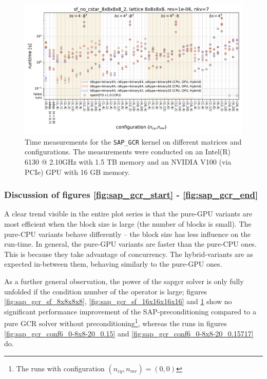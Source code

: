 \documentclass{article}
\theoremstyle{plain} %
\theoremstyle{convention} %
\theoremstyle{remark} %
\def\code#1{\texttt{#1}}
\numberwithin{equation}{section}
\begin{document}
\begin{figure}[htbp]
    \centering
    \includegraphics[width=1.0\textwidth]{plots/sap_gcr_sf_no_cstar_8x8x8x8_2_lattice_8x8x8x8_res=1e-06_nkv=7}
    \caption{Time measurements for the \code{SAP\_GCR} kernel on different matrices and configurations. The measurements were conducted on an Intel(R) 6130 @ 2.10GHz with 1.5 TB memory and an NVIDIA V100 (via PCIe) GPU with 16 GB memory.}
    \label{fig:sap_gcr4}
    \label{fig:sap_gcr_end}
    \label{fig:sap_gcr_sf_8x8x8x8_2}
\end{figure}

\subsubsection{Discussion of figures \ref{fig:sap_gcr_start} - \ref{fig:sap_gcr_end}}

A clear trend visible in the entire plot series is that the pure-GPU variants are most efficient when the block size is large (the number of blocks is small). The pure-CPU variants behave differently -- the block size has less influence on the run-time. In general, the pure-GPU variants are faster than the pure-CPU ones. This is because they take advantage of concurrency. The hybrid-variants are as expected in-between them, behaving similarly to the pure-GPU ones.

As a further general observation, the power of the \acrshort{sapgcr} solver is only fully unfolded if the condition number of the operator is large; figures \ref{fig:sap_gcr_sf_8x8x8x8}, \ref{fig:sap_gcr_sf_16x16x16x16} and \ref{fig:sap_gcr_sf_8x8x8x8_2} show no significant performance improvement of the SAP-preconditioning compared to a pure GCR solver without preconditioning\footnote{The runs with configuration $(n_{cy}, n_{mr}) = (0,0)$}, whereas the runs in figures \ref{fig:sap_gcr_conf6_0-8x8-20_0.15} and \ref{fig:sap_gcr_conf6_0-8x8-20_0.15717} do.
\end{document}
